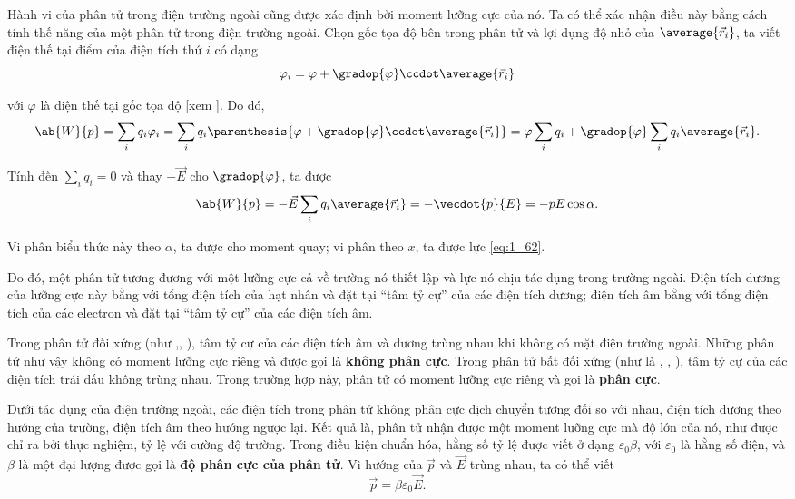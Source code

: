 Hành vi của phân tử trong điện trường ngoài cũng được xác định bởi moment lưỡng cực của nó. Ta có thể xác nhận điều này bằng cách tính thế năng của một phân tử trong điện trường ngoài. Chọn gốc tọa độ bên trong phân tử và lợi dụng độ nhỏ của $\average{\vec{r}_i}$, ta viết điện thế tại điểm của điện tích thứ $i$ có dạng
\begin{equation*}
    \varphi_i = \varphi + \gradop{\varphi} \ccdot \average{\vec{r}_i}
\end{equation*}

\noindent
với $\varphi$ là điện thế tại gốc tọa độ [xem ]. Do đó,
\begin{equation*}
    \ab{W}{p} = \sum_i q_i \varphi_i = \sum_i q_i \parenthesis{\varphi + \gradop{\varphi} \ccdot \average{\vec{r}_i}} = \varphi \sum_i q_i + \gradop{\varphi} \sum_i q_i \average{\vec{r}_i}.
\end{equation*}

\noindent
Tính đến $\sum_i q_i=0$ và thay $-\vec{E}$ cho $\gradop{\varphi}$, ta được
\begin{equation*}
    \ab{W}{p} = -\vec{E} \sum_i q_i \average{\vec{r}_i} = -\vecdot{p}{E} = -p E \cos\alpha.
\end{equation*}

\noindent
Vi phân biểu thức này theo $\alpha$, ta được  cho moment quay; vi phân theo $x$, ta được lực \eqref{eq:1_62}.

Do đó, một phân tử tương đương với một lưỡng cực cả về trường nó thiết lập và lực nó chịu tác dụng trong trường ngoài. Điện tích dương của lưỡng cực này bằng với tổng điện tích của hạt nhân và đặt tại ``tâm tỷ cự'' của các điện tích dương; điện tích âm bằng với tổng điện tích của các electron và đặt tại ``tâm tỷ cự'' của các điện tích âm.

Trong phân tử đối xứng (như ,, ), tâm tỷ cự của các điện tích âm và dương trùng nhau khi không có mặt điện trường ngoài. Những phân tử như vậy không có moment lưỡng cực riêng và được gọi là \textbf{không phân cực}. Trong phân tử bất đối xứng (như là , , ), tâm tỷ cự của các điện tích trái dấu không trùng nhau. Trong trường hợp này, phân tử có moment lưỡng cực riêng và gọi là \textbf{phân cực}.

Dưới tác dụng của điện trường ngoài, các điện tích trong phân tử không phân cực dịch chuyển tương đối so với nhau, điện tích dương theo hướng của trường, điện tích âm theo hướng ngược lại. Kết quả là, phân tử nhận được một moment lưỡng cực mà độ lớn của nó, như được chỉ ra bởi thực nghiệm, tỷ lệ với cường độ trường. Trong điều kiện chuẩn hóa, hằng số tỷ lệ được viết ở dạng $\varepsilon_0\beta$, với $\varepsilon_0$ là hằng số điện, và $\beta$ là một đại lượng được gọi là \textbf{độ phân cực của phân tử}. Vì hướng của $\vec{p}$ và $\vec{E}$ trùng nhau, ta có thể viết
\begin{equation}\label{eq:2_3}
    \vec{p} = \beta \varepsilon_0 \vec{E}.
\end{equation}

